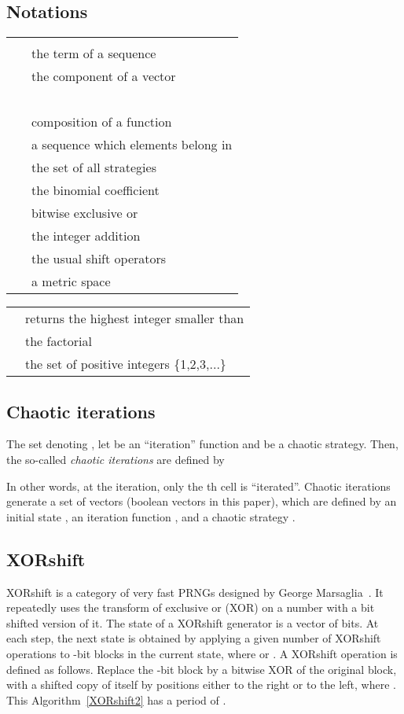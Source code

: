 \documentclass[10pt, a4paper, conference, compsocconf]{IEEEtran}
\begin{document}
\subsection{Notations}
\begin{tabular}{@{}c@{}@{}l@{}}
 &  \\
 &  the  term of a sequence  \\
 &  the  component of a vector \\
        &~~~~\\
 &   composition of a function  \\
~ &  a sequence which elements belong in  \\
 &  the set of all strategies \\
 &  the binomial coefficient \\
 &  bitwise exclusive or \\
 &  the integer addition \\
 &  the usual shift operators \\
 &  a metric space  \\
\end{tabular}

\begin{tabular}{@{}c@{}@{}l@{}}




 &  returns the highest integer smaller than   \\
 &  the factorial \\
 &  the set of positive integers \{1,2,3,...\}
\end{tabular}

\subsection{Chaotic iterations}
\label{subsection:Chaotic iterations}
\begin{definition}
The set  denoting , let  be an ``iteration'' function and  be a chaotic strategy. Then, the so-called \emph{chaotic iterations} are defined by~\cite{Robert1986}

\end{definition}
In other words, at the  iteration, only the th cell is
\textquotedblleft iterated\textquotedblright.
Chaotic iterations generate a set of vectors (boolean vectors in this paper),
which are defined by an initial state , an iteration function , and a
chaotic strategy .

\subsection{XORshift}
\label{XORshift}
XORshift is a category of very fast PRNGs designed by George Marsaglia~\cite{Marsaglia2003}.
It repeatedly uses the transform of exclusive or (XOR) on a number with a bit shifted version of it. The state of a XORshift generator is a vector of bits. At each step, the next state is obtained by applying a given number of XORshift operations to -bit blocks in the current state, where  or . A XORshift operation is defined as follows. Replace the -bit block by a bitwise XOR of the original block, with a shifted copy of itself by  positions either to the right or to the left, where . This Algorithm~\ref{XORshift2} has a period of .
\end{document}
